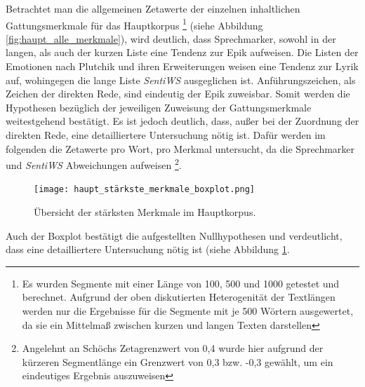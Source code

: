 \documentclass[a4paper,10p]{article}
\begin{document}
Betrachtet man die allgemeinen Zetawerte der einzelnen inhaltlichen Gattungsmerkmale für das Hauptkorpus \footnote{Es wurden Segmente mit einer Länge von 100, 500 und 1000 getestet und berechnet. Aufgrund der oben diskutierten Heterogenität der Textlängen werden nur die Ergebnisse für die Segmente mit je 500 Wörtern ausgewertet, da sie ein Mittelmaß zwischen kurzen und langen Texten darstellen} (siehe Abbildung  \ref{fig:haupt_alle_merkmale}), wird deutlich, dass Sprechmarker, sowohl in der langen, als auch der kurzen Liste eine Tendenz zur Epik aufweisen. Die Listen der Emotionen nach Plutchik und ihren Erweiterungen weisen eine Tendenz zur Lyrik auf, wohingegen die lange Liste \textit{SentiWS} ausgeglichen ist. Anführungszeichen, als Zeichen der direkten Rede, sind eindeutig der Epik zuweisbar. Somit werden die Hypothesen bezüglich der jeweiligen Zuweisung der Gattungsmerkmale weitestgehend bestätigt. Es ist jedoch deutlich, dass, außer bei der Zuordnung der direkten Rede, eine detailliertere Untersuchung nötig ist. Dafür werden im folgenden die Zetawerte pro Wort, pro Merkmal untersucht, da die Sprechmarker und \textit{SentiWS} Abweichungen aufweisen \footnote{Angelehnt an Schöchs Zetagrenzwert von 0,4 wurde hier aufgrund der kürzeren Segmentlänge ein Grenzwert von 0,3 bzw. -0,3 gewählt, um ein eindeutiges Ergebnis auszuweisen}.\par 

\begin{figure}
	\texttt{[image: haupt\_stärkste\_merkmale\_boxplot.png]}
	\caption{Übersicht der stärksten Merkmale im Hauptkorpus.}
	\label{fig:haupt_stärkste_merkmale_boxplot}
\end{figure}


Auch der Boxplot bestätigt die aufgestellten Nullhypothesen und verdeutlicht, dass eine detailliertere Untersuchung nötig ist (siehe Abbildung \ref{fig:haupt_stärkste_merkmale_boxplot}.
\end{document}
